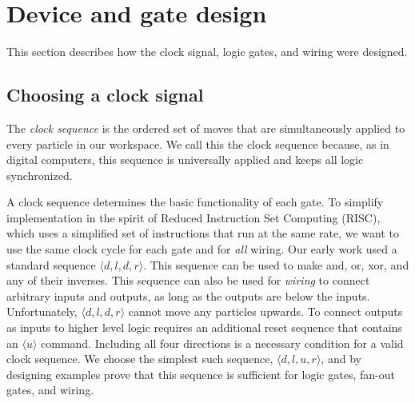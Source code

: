 \documentclass[letterpaper, 10 pt, conference]{ieeeconf}
\begin{document}
\section{Device and gate design}\label{sec:Design}
This section describes how the clock signal, logic gates, and wiring were designed.

\subsection{Choosing a clock signal}

The \emph{clock sequence} is the ordered set of moves that are simultaneously applied to every particle in our workspace. We call this the clock sequence because, as in digital computers, this sequence is universally applied and keeps all logic synchronized.

A clock sequence determines the basic functionality of each gate.  To simplify implementation in the spirit of Reduced Instruction Set Computing (RISC), which uses a simplified set of instructions that run at the same rate, we want to use the same clock cycle for each gate and for \emph{all} wiring. 
Our early work used a standard sequence  $\langle d,l,d,r \rangle$.  This sequence can be used to make {\sc and, or, xor}, and any of their inverses.  This sequence can also be used for \emph{wiring} to connect arbitrary inputs and outputs, as long as the outputs are below the inputs.  Unfortunately, $\langle d,l,d,r \rangle$ cannot move any particles upwards. To connect outputs as inputs to higher level logic requires an additional reset sequence that contains an $\langle u \rangle$ command.  Including all four directions is a necessary condition for a valid clock sequence.  We choose the simplest such sequence, $\langle d,l,u,r \rangle$, and by designing examples prove that this sequence is sufficient for logic gates, {\sc fan-out} gates, and wiring.
\end{document}
